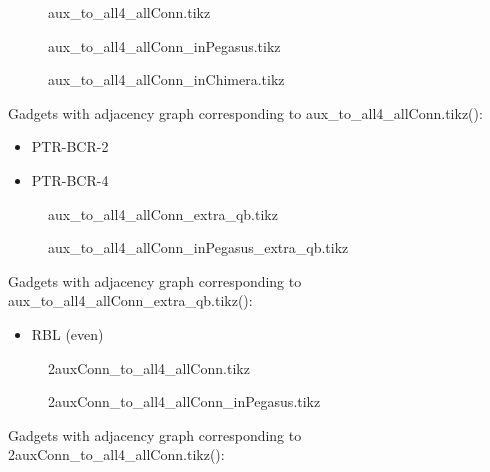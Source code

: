 \documentclass{article}
\begin{document}
\begin{figure}

\caption{aux\_to\_all4\_allConn.tikz}
\end{figure}

\begin{figure}

\caption{aux\_to\_all4\_allConn\_inPegasus.tikz}
\end{figure}

\begin{figure}

\caption{aux\_to\_all4\_allConn\_inChimera.tikz}
\end{figure}

Gadgets with adjacency graph corresponding to aux\_to\_all4\_allConn.tikz(\scalebox{.25}{}):

\begin{itemize}
\item PTR-BCR-2
\item PTR-BCR-4
\end{itemize}

\begin{figure}

\caption{aux\_to\_all4\_allConn\_extra\_qb.tikz}
\end{figure}

\begin{figure}

\caption{aux\_to\_all4\_allConn\_inPegasus\_extra\_qb.tikz}
\end{figure}



Gadgets with adjacency graph corresponding to aux\_to\_all4\_allConn\_extra\_qb.tikz(\scalebox{.25}{}):

\begin{itemize}
\item RBL (even)
\end{itemize}

\begin{figure}

\caption{2auxConn\_to\_all4\_allConn.tikz}
\end{figure}

\begin{figure}

\caption{2auxConn\_to\_all4\_allConn\_inPegasus.tikz}
\end{figure}

Gadgets with adjacency graph corresponding to 2auxConn\_to\_all4\_allConn.tikz(\scalebox{.25}{}):
\end{document}
